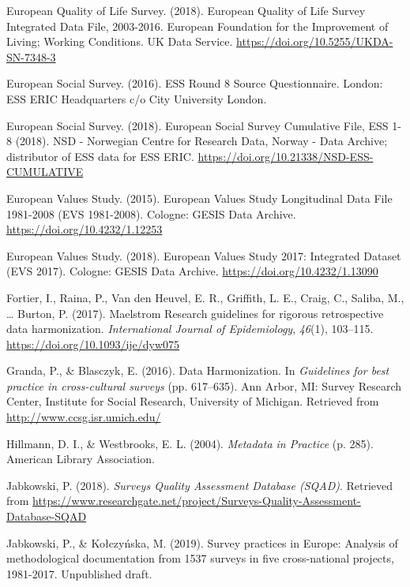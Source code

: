 \documentclass[12pt,]{article}
\begin{document}
\leavevmode\hypertarget{ref-EQLS2018}{}%
European Quality of Life Survey. (2018). European Quality of Life Survey Integrated Data File, 2003-2016. European Foundation for the Improvement of Living; Working Conditions. UK Data Service. \url{https://doi.org/10.5255/UKDA-SN-7348-3}

\leavevmode\hypertarget{ref-ESS2016b}{}%
European Social Survey. (2016). ESS Round 8 Source Questionnaire. London: ESS ERIC Headquarters c/o City University London.

\leavevmode\hypertarget{ref-ESS2018}{}%
European Social Survey. (2018). European Social Survey Cumulative File, ESS 1-8 (2018). NSD - Norwegian Centre for Research Data, Norway - Data Archive; distributor of ESS data for ESS ERIC. \url{https://doi.org/10.21338/NSD-ESS-CUMULATIVE}

\leavevmode\hypertarget{ref-EVS2015}{}%
European Values Study. (2015). European Values Study Longitudinal Data File 1981-2008 (EVS 1981-2008). Cologne: GESIS Data Archive. \url{https://doi.org/10.4232/1.12253}

\leavevmode\hypertarget{ref-EVS2018}{}%
European Values Study. (2018). European Values Study 2017: Integrated Dataset (EVS 2017). Cologne: GESIS Data Archive. \url{https://doi.org/10.4232/1.13090}

\leavevmode\hypertarget{ref-Fortier2017a}{}%
Fortier, I., Raina, P., Van den Heuvel, E. R., Griffith, L. E., Craig, C., Saliba, M., \ldots{} Burton, P. (2017). Maelstrom Research guidelines for rigorous retrospective data harmonization. \emph{International Journal of Epidemiology}, \emph{46}(1), 103--115. \url{https://doi.org/10.1093/ije/dyw075}

\leavevmode\hypertarget{ref-Granda2016}{}%
Granda, P., \& Blasczyk, E. (2016). Data Harmonization. In \emph{Guidelines for best practice in cross-cultural surveys} (pp. 617--635). Ann Arbor, MI: Survey Research Center, Institute for Social Research, University of Michigan. Retrieved from \url{http://www.ccsg.isr.umich.edu/}

\leavevmode\hypertarget{ref-Hillmann2004}{}%
Hillmann, D. I., \& Westbrooks, E. L. (2004). \emph{Metadata in Practice} (p. 285). American Library Association.

\leavevmode\hypertarget{ref-Jabkowski2018}{}%
Jabkowski, P. (2018). \emph{Surveys Quality Assessment Database (SQAD)}. Retrieved from \url{https://www.researchgate.net/project/Surveys-Quality-Assessment-Database-SQAD}

\leavevmode\hypertarget{ref-Jabkowski2019}{}%
Jabkowski, P., \& Kołczyńska, M. (2019). Survey practices in Europe: Analysis of methodological documentation from 1537 surveys in five cross-national projects, 1981-2017. Unpublished draft.
\end{document}
